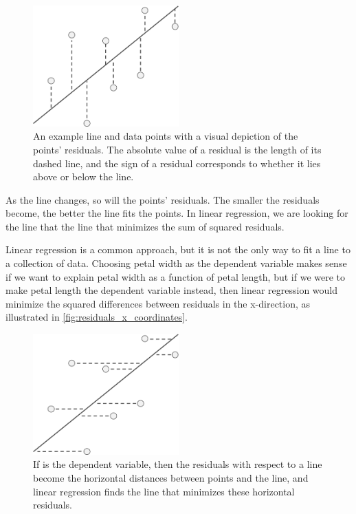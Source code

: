 \begin{figure}[h]
\centering
\mySfFamily
\includegraphics[width = 0.5\textwidth]{../images/residuals_y_coordinates.png}
\caption{An example line and data points with a visual depiction of the points' residuals. The absolute value of a residual is the length of its dashed line, and the sign of a residual corresponds to whether it lies above or below the line.}
\label{fig:residuals_y_coordinates}
\end{figure}

As the line changes, so will the points' residuals. The smaller the residuals become, the better the line fits the points. In linear regression, we are looking for the line that the line that minimizes the sum of squared residuals.

Linear regression is a common approach, but it is not the only way to fit a line to a collection of data. Choosing petal width as the dependent variable makes sense if we want to explain petal width as a function of petal length, but if we were to make petal length the dependent variable instead, then linear regression would minimize the squared differences between residuals in the x-direction, as illustrated in \autoref{fig:residuals_x_coordinates}.\\

\begin{figure}[h]
\centering
\mySfFamily
\includegraphics[width = 0.5\textwidth]{../images/residuals_x_coordinates.png}
\caption{If  is the dependent variable, then the residuals with respect to a line become the horizontal distances between points and the line, and linear regression finds the line that minimizes these horizontal residuals.}
\label{fig:residuals_x_coordinates}
\end{figure}

